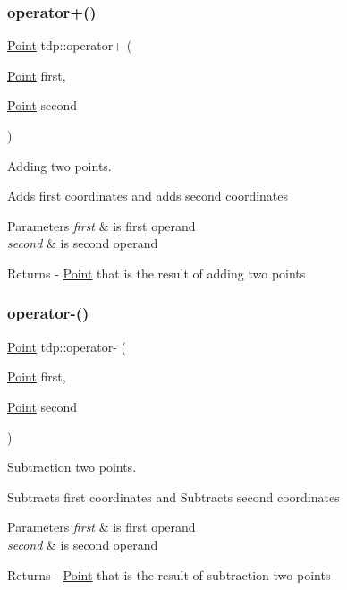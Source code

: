 \subsubsection{\texorpdfstring{operator+()}{operator+()}}
{\footnotesize\ttfamily \mbox{\hyperlink{structtdp_1_1_point}{Point}} tdp\+::operator+ (\begin{DoxyParamCaption}\item[{\mbox{\hyperlink{structtdp_1_1_point}{Point}}}]{first,  }\item[{\mbox{\hyperlink{structtdp_1_1_point}{Point}}}]{second }\end{DoxyParamCaption})}



Adding two points. 

Adds first coordinates and adds second coordinates 
\begin{DoxyParams}{Parameters}
{\em first} & is first operand \\
\hline
{\em second} & is second operand \\
\hline
\end{DoxyParams}
\begin{DoxyReturn}{Returns}
-\/ \mbox{\hyperlink{structtdp_1_1_point}{Point}} that is the result of adding two points 
\end{DoxyReturn}
\mbox{\label{namespacetdp_ab8dc4a4b6272d3a8ef06f22a5b07daec}} 
\subsubsection{\texorpdfstring{operator-\/()}{operator-()}}
{\footnotesize\ttfamily \mbox{\hyperlink{structtdp_1_1_point}{Point}} tdp\+::operator-\/ (\begin{DoxyParamCaption}\item[{\mbox{\hyperlink{structtdp_1_1_point}{Point}}}]{first,  }\item[{\mbox{\hyperlink{structtdp_1_1_point}{Point}}}]{second }\end{DoxyParamCaption})}



Subtraction two points. 

Subtracts first coordinates and Subtracts second coordinates 
\begin{DoxyParams}{Parameters}
{\em first} & is first operand \\
\hline
{\em second} & is second operand \\
\hline
\end{DoxyParams}
\begin{DoxyReturn}{Returns}
-\/ \mbox{\hyperlink{structtdp_1_1_point}{Point}} that is the result of subtraction two points 
\end{DoxyReturn}
\mbox{\label{namespacetdp_aa76700935906dbb491a443a4662d758f}} 
